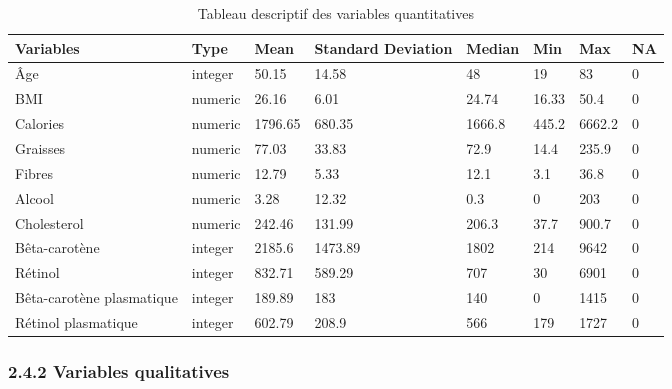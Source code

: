 \documentclass[]{article}
\begin{document}
\begin{table}

\caption{\label{tab:unnamed-chunk-4}Tableau descriptif des variables quantitatives}
\centering
\begin{tabular}[t]{l|l|l|l|l|l|l|l}
\hline
Variables & Type & Mean & Standard Deviation & Median & Min & Max & NA\\
\hline
\rowcolor[HTML]{BBD2E1}  Âge & integer & 50.15 & 14.58 & 48 & 19 & 83 & 0\\
\hline
BMI & numeric & 26.16 & 6.01 & 24.74 & 16.33 & 50.4 & 0\\
\hline
\rowcolor[HTML]{BBD2E1}  Calories & numeric & 1796.65 & 680.35 & 1666.8 & 445.2 & 6662.2 & 0\\
\hline
Graisses & numeric & 77.03 & 33.83 & 72.9 & 14.4 & 235.9 & 0\\
\hline
\rowcolor[HTML]{BBD2E1}  Fibres & numeric & 12.79 & 5.33 & 12.1 & 3.1 & 36.8 & 0\\
\hline
Alcool & numeric & 3.28 & 12.32 & 0.3 & 0 & 203 & 0\\
\hline
\rowcolor[HTML]{BBD2E1}  Cholesterol & numeric & 242.46 & 131.99 & 206.3 & 37.7 & 900.7 & 0\\
\hline
Bêta-carotène & integer & 2185.6 & 1473.89 & 1802 & 214 & 9642 & 0\\
\hline
\rowcolor[HTML]{BBD2E1}  Rétinol & integer & 832.71 & 589.29 & 707 & 30 & 6901 & 0\\
\hline
Bêta-carotène plasmatique & integer & 189.89 & 183 & 140 & 0 & 1415 & 0\\
\hline
\rowcolor[HTML]{BBD2E1}  Rétinol plasmatique & integer & 602.79 & 208.9 & 566 & 179 & 1727 & 0\\
\hline
\end{tabular}
\end{table}

\subsubsection{2.4.2 Variables
qualitatives}\label{variables-qualitatives}
\end{document}
